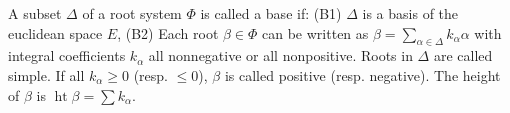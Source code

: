 A subset $\Delta$ of a root system $\Phi$ is called a base if:
(B1) $\Delta$ is a basis of the euclidean space $E$,
(B2) Each root $\beta \in \Phi$ can be written as $\beta = \sum_{\alpha \in \Delta} k_\alpha \alpha$ with integral coefficients $k_\alpha$ all nonnegative or all nonpositive.
Roots in $\Delta$ are called simple. If all $k_\alpha \geq 0$ (resp. $\leq 0$), $\beta$ is called positive (resp. negative). The height of $\beta$ is $\operatorname{ht}\beta = \sum k_\alpha$.

